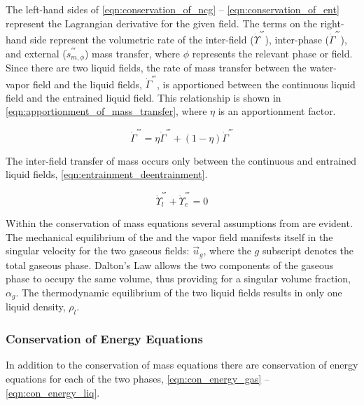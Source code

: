 The left-hand sides of \eqref{eqn:conservation_of_ncg} -- \eqref{eqn:conservation_of_ent} represent the Lagrangian derivative for the given field.
The terms on the right-hand side represent the volumetric rate of the inter-field ($\dot{\Upsilon}^{'''}$), inter-phase ($\dot{\Gamma}^{'''}$), and external ($\dot{s}^{'''}_{m,\phi}$) mass transfer, where $\phi$ represents the relevant phase or field.
Since there are two liquid fields, the rate of mass transfer between the water-vapor field and the liquid fields, $\dot{\Gamma}^{'''}$, is apportioned between the continuous liquid field and the entrained liquid field.
This relationship is shown in \eqref{eqn:apportionment_of_mass_transfer}, where $\eta$ is an apportionment factor. 

\begin{equation}
\label{eqn:apportionment_of_mass_transfer}
\dot{\Gamma}^{'''} = \eta \dot{\Gamma}^{'''} + (1 - \eta)\dot{\Gamma}^{'''}
\end{equation}

The inter-field transfer of mass occurs only between the continuous and entrained liquid fields, \eqref{eqn:entrainment_deentrainment}.

\begin{equation}
\label{eqn:entrainment_deentrainment}
\dot{\Upsilon}^{'''}_l + \dot{\Upsilon}^{'''}_e = 0
\end{equation}

Within the conservation of mass equations several assumptions from  are evident.
The mechanical equilibrium of the \ncg{} and the vapor field manifests itself in the singular velocity for the two gaseous fields: $\vec{u}_g$, where the $g$ subscript denotes the total gaseous phase.
Dalton's Law allows the two components of the gaseous phase to occupy the same volume, thus providing for a singular volume fraction, $\alpha_g$.
The thermodynamic equilibrium of the two liquid fields results in only one liquid density, $\rho_l$.

\subsubsection{Conservation of Energy Equations}
\label{subsubsect:energy_equations}

In addition to the conservation of mass equations there are conservation of energy equations for each of the two phases, \eqref{eqn:con_energy_gas} -- \eqref{eqn:con_energy_liq}.

